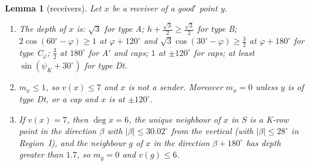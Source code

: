 \documentclass[11pt]{amsart}
\newtheorem{lemma}[theorem]{Lemma}
\theoremstyle{definition}
\theoremstyle{remark}
\begin{document}
\begin{lemma}[receivers]\label{lem:recv2}
Let $x$ be a receiver of a good$'$ point $y$.
\begin{enumerate}[label=\textup{(\alph*)}]
\item The depth of $x$ is: $\sqrt3$ for type A; $h+\frac{\sqrt3}2\ge\frac{\sqrt3}2$ for type B; $2\cos(60^\circ-\varphi)\ge1$ at $\varphi+120^\circ$ and $\sqrt3\cos(30^\circ-\varphi)\ge\frac32$ at $\varphi+180^\circ$ for type C$_\varphi$; $\frac32$ at $180^\circ$ for A$'$ and caps; $1$ at $\pm120^\circ$ for caps; at least $\sin(\psi_K+30^\circ)$ for type Dt.
\item $m_x\le1$, so $v(x)\le7$ and $x$ is not a sender. Moreover $m_x=0$ unless $y$ is of type Dt, or a cap and $x$ is at $\pm120^\circ$.
\item If $v(x)=7$, then $\deg x=6$, the unique neighbour of $x$ in $S$ is a K-row point in the direction $\beta$ with $|\beta|\le30.02^\circ$ from the vertical (with $|\beta|\le28^\circ$ in Region~I), and the neighbour $g$ of $x$ in the direction $\beta+180^\circ$ has depth greater than $1.7$, so $m_g=0$ and $v(g)\le6$.
\end{enumerate}
\end{lemma}
\end{document}
